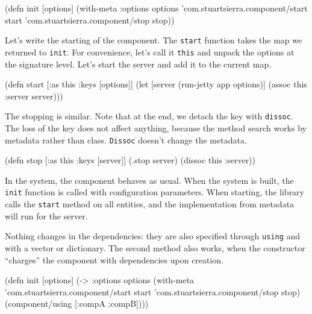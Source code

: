 \else

\begin{english}
  \begin{clojure}
(defn init [options]
  (with-meta {:options options}
    {'com.stuartsierra.component/start start
     'com.stuartsierra.component/stop stop}))
  \end{clojure}
\end{english}

\fi

Let's write the starting of the component. The \verb|start| function takes the map we returned to \verb|init|. For convenience, let's call it \verb|this| and unpack the options at the signature level. Let's start the server and add it to the current map.

\begin{english}
  \begin{clojure}
(defn start
  [{:as this :keys [options]}]
  (let [server (run-jetty app options)]
    (assoc this :server server)))
  \end{clojure}
\end{english}

The stopping is similar. Note that at the end, we detach the key with \verb|dissoc|. The loss of the key does not affect anything, because the method search works by metadata rather than class. \verb|Dissoc| doesn't change the metadata.

\begin{english}
  \begin{clojure}
(defn stop
  [{:as this :keys [server]}]
  (.stop server)
  (dissoc this :server))
  \end{clojure}
\end{english}

In the system, the component behaves as usual. When the system is built, the \verb|init| function is called with configuration parameters. When starting, the library calls the \verb|start| method on all entities, and the implementation from metadata will run for the server.

Nothing changes in the dependencies: they are also specified through \verb|using| and with a vector or dictionary. The second method also works, when the constructor ``charges'' the component with dependencies upon creation.

\ifnarrow

\begin{english}
  \begin{clojure}
(defn init [options]
  (->
    {:options options}
    (with-meta
     {'com.stuartsierra.component/start
      start
      'com.stuartsierra.component/stop
      stop})
    (component/using [:compA :compB])))
  \end{clojure}
\end{english}

